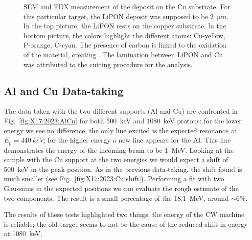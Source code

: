 \begin{refsection}
\begin{figure}
            \caption[SEM EDX LiPON analysis]{SEM and EDX measurement of the  deposit on the Cu substrate. For this particular target, the LiPON deposit was supposed to be \SI{2}{\micro m}. In the top picture, the LiPON rests on the copper substrate. In the bottom picture, the colors highlight the different atoms: Cu-yellow, P-orange, C-cyan. The presence of carbon is linked to the oxidation of the material, creating . The lamination between LiPON and Cu was attributed to the cutting procedure for the analysis.}
            \label{fig:X17:target:LiPON:psi}
        \end{figure}  

    \subsection{Al and Cu Data-taking} 
        The data taken with the two different supports (Al and Cu) are confronted in Fig.~\ref{fig:X17:2023:AlCu} for both \SI{500}{keV} and \SI{1080}{keV} protons: for the lower energy we see no difference, the only line excited is the expected resonance at $E_p=\SI{440}{keV}$; for the higher energy a new line appears for the Al. This line demonstrates the energy of the incoming beam to be \SI{1}{MeV}.
        Looking at the sample with the Cu support at the two energies we would expect a shift of \SI{500}{keV} in the peak position. As in the previous data-taking, the shift found is much smaller (see Fig.~\ref{fig:X17:2023:Cu:shift}). Performing a fit with two Gaussians in the expected positions we can evaluate the rough estimate of the two components. The result is a small percentage of the \SI{18.1}{MeV}, around $\sim6\%$.

        \noindent
        The results of these tests highlighted two things: the energy of the CW machine is reliable; the old target seems to not be the cause of the reduced shift in energy at \SI{1080}{keV}.
    

\end{refsection}
